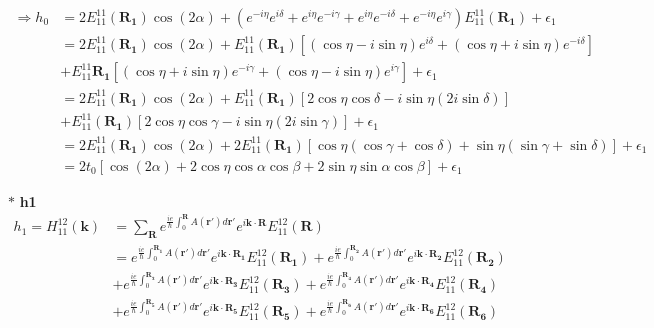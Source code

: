 \documentclass{article}
\begin{document}
\begin{align*}
	\Rightarrow h_0 & = 2 E_{11}^{11}(\mathbf{R_1}) \cos (2\alpha) + (e^{-i\eta}e^{i\delta} + e^{i\eta}e^{-i\gamma} + e^{i\eta}e^{-i\delta} + e^{-i\eta}e^{i\gamma} ) E_{11}^{11}(\mathbf{R_1}) +\epsilon_1 \\
	                & = 2 E_{11}^{11}(\mathbf{R_1}) \cos (2\alpha) + E_{11}^{11}(\mathbf{R_1}) \left[(\cos\eta - i\sin\eta ) e^{i\delta} + (\cos\eta + i\sin\eta )e^{-i\delta} \right]                      \\
	                & + E_{11}^{11}\mathbf{R_1} \left[(\cos\eta + i \sin\eta)e^{-i\gamma} + (\cos\eta - i \sin\eta)e^{i\gamma}\right] +  \epsilon_1                                                         \\
	                & = 2 E_{11}^{11}(\mathbf{R_1}) \cos (2\alpha) + E_{11}^{11}(\mathbf{R_1}) \left[2\cos\eta \cos\delta - i\sin\eta( 2i\sin\delta)  \right]                                               \\
	                & + E_{11}^{11}(\mathbf{R_1}) \left[2\cos\eta \cos\gamma - i\sin\eta( 2i\sin\gamma)  \right] +   \epsilon_1                                                                             \\
	                & = 2 E_{11}^{11}(\mathbf{R_1}) \cos (2\alpha) + 2E_{11}^{11}(\mathbf{R_1}) \left[\cos\eta (\cos\gamma + \cos\delta) + \sin\eta(\sin\gamma + \sin\delta)\right] +   \epsilon_1          \\
	                & = 2 t_0 \left[ \cos (2\alpha) + 2\cos\eta \cos\alpha\cos\beta + 2\sin\eta\sin\alpha\cos\beta\right] +   \epsilon_1
\end{align*}

\noindent $\ast$ \textbf{h1}
\begin{align*}
	h_1 = H_{11}^{12}(\textbf{k}) & = \sum_{\textbf{R}} e^{\frac{ie}{\hbar}\int_{0}^{\mathbf{R}}A(\mathbf{r'})d\mathbf{r'}}e^{i\mathbf{k\cdot R}} E_{11}^{12}(\mathbf{R})                                                                                                               \\
	                              & = e^{\frac{ie}{\hbar}\int_{0}^{\mathbf{R_1}}A(\mathbf{r'})d\mathbf{r'}}e^{i\mathbf{k\cdot R_1}} E_{11}^{12}(\mathbf{R_1}) + e^{\frac{ie}{\hbar}\int_{0}^{\mathbf{R_2}}A(\mathbf{r'})d\mathbf{r'}}e^{i\mathbf{k\cdot R_2}} E_{11}^{12}(\mathbf{R_2}) \\
	                              & + e^{\frac{ie}{\hbar}\int_{0}^{\mathbf{R_3}}A(\mathbf{r'})d\mathbf{r'}}e^{i\mathbf{k\cdot R_3}} E_{11}^{12}(\mathbf{R_3}) + e^{\frac{ie}{\hbar}\int_{0}^{\mathbf{R_4}}A(\mathbf{r'})d\mathbf{r'}}e^{i\mathbf{k\cdot R_4}} E_{11}^{12}(\mathbf{R_4}) \\
	                              & + e^{\frac{ie}{\hbar}\int_{0}^{\mathbf{R_5}}A(\mathbf{r'})d\mathbf{r'}}e^{i\mathbf{k\cdot R_5}} E_{11}^{12}(\mathbf{R_5}) + e^{\frac{ie}{\hbar}\int_{0}^{\mathbf{R_6}}A(\mathbf{r'})d\mathbf{r'}}e^{i\mathbf{k\cdot R_6}} E_{11}^{12}(\mathbf{R_6})
\end{align*}
\end{document}
